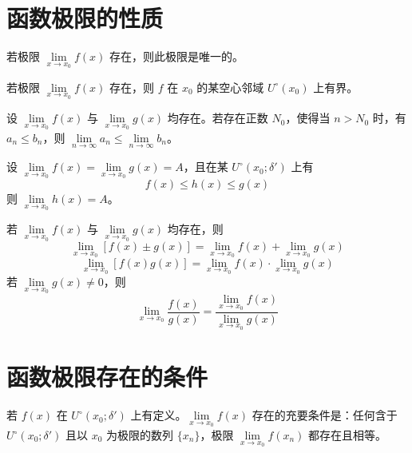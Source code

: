 \section{函数极限的性质}

\begin{theorem}[唯一性]
	若极限 $\lim\limits_{x \to x_0}f(x)$ 存在，则此极限是唯一的。
\end{theorem}

\begin{theorem}[局部有界性]
	若极限 $\lim\limits_{x \to x_0}f(x)$ 存在，则 $f$ 在 $x_0$ 的某空心邻域 $U^\circ(x_0)$ 上有界。
\end{theorem}

\begin{theorem}[局部保序性]
	设 $\lim\limits_{x \to x_0}f(x)$ 与 $\lim\limits_{x \to x_0}g(x)$ 均存在。若存在正数 $N_0$，使得当 $n>N_0$ 时，有 $a_n\leqslant b_n$，则 $\lim\limits_{n\to \infty}a_n \leqslant \lim\limits_{n\to \infty}b_n$。
\end{theorem}

\begin{theorem}[夹逼定理]
	设 $\lim\limits_{x \to x_0}f(x) = \lim\limits_{x \to x_0}g(x) = A$，且在某 $U^\circ(x_0;\delta')$ 上有
	\[ f(x)\leqslant h(x) \leqslant g(x) \]
	则 $\lim\limits_{x \to x_0}h(x) = A$。
\end{theorem}

\begin{theorem}[四则运算法则]
	若 $\lim\limits_{x \to x_0}f(x)$ 与 $\lim\limits_{x \to x_0}g(x)$ 均存在，则
	\[ \lim_{x \to x_0}[f(x)\pm g(x)] = \lim_{x \to x_0}f(x) + \lim_{x \to x_0}g(x) \]
	\[ \lim_{x \to x_0}[f(x)g(x)] = \lim_{x \to x_0}f(x) \cdot \lim_{x \to x_0}g(x) \]
	若 $\lim\limits_{x \to x_0}g(x)\ne 0$，则
	\[ \lim_{x \to x_0}\frac{f(x)}{g(x)} = \frac{\lim\limits_{x \to x_0}f(x)}{\lim\limits_{x \to x_0}g(x)} \]
\end{theorem}

\section{函数极限存在的条件}

\begin{theorem}[海涅 Heine 定理]
	若 $f(x)$ 在 $U^\circ(x_0;\delta')$ 上有定义。$\lim\limits_{x \to x_0}f(x)$ 存在的充要条件是：任何含于 $U^\circ(x_0;\delta')$ 且以 $x_0$ 为极限的数列 $\{x_n\}$，极限 $\lim\limits_{x \to x_0}f(x_n)$ 都存在且相等。
\end{theorem}

